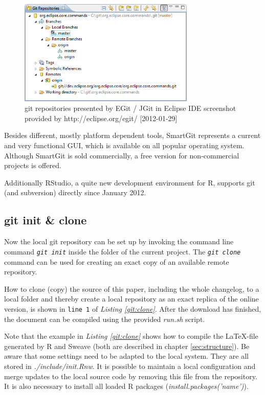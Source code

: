 \documentclass{ifacconf}
\begin{document}
\begin{figure}[h]
\begin{center}
\includegraphics[width=8.4cm]{pics/EGit.png}    %
\caption{git repositories presented by EGit / JGit in Eclipse IDE \newline 
screenshot provided by http://eclipse.org/egit/ [2012-01-29]} 
\label{fig:JGit}
\end{center}
\end{figure}

Besides different, mostly platform dependent tools, 
SmartGit represents a current and very functional GUI, which
is available on all popular operating system. Although SmartGit is sold commercially,
a free version for non-commercial projects is offered.

Additionally RStudio, a quite new development environment for R, supports git (and subversion)
directly since January 2012.


\subsection{git init \& clone}
Now the local git repository can be set up by invoking the
command line command \textit{\lstinline!git init!} inside
the folder of the current project. The \textit{\lstinline!git clone!} 
command can be used for creating an exact copy of an available remote repository.

How to clone (copy) the source of this paper, including the whole changelog, to a local folder 
and thereby create a local repository as an exact replica of the online version,
is shown in \verb|line 1| of \textit{Listing \ref{git:clone}}. After the download has
finished, the document can be compiled using the provided \textit{run.sh} script. 

Note that the example in \textit{Listing \ref{git:clone}} shows how to compile 
the \LaTeX-file generated by R and Sweave (both are described in chapter \ref{sec:structure}).
Be aware that some settings need to be adapted to the local system. They are all stored
in \textit{./include/init.Rnw}. It is possible to maintain a local configuration and 
merge updates to the local source code by removing this file from the repository.
It is also necessary to install all loaded R packages (\textit{install.packages('name')}).
\end{document}
